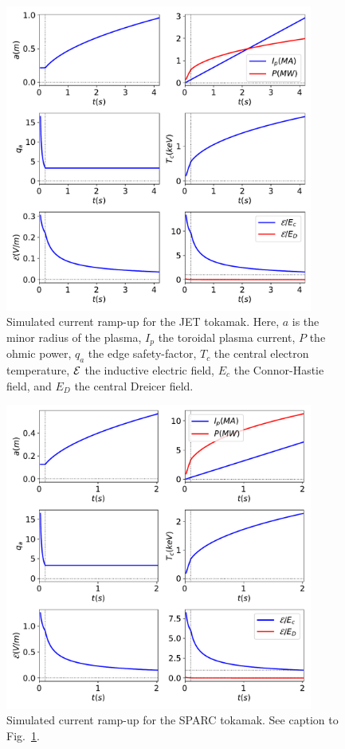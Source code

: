 \documentclass[12pt,prb,aps]{revtex4-1}
\begin{document}
\begin{figure}
\centerline{\includegraphics[width=0.9\textwidth]{Figure4.pdf}}
\caption{Simulated current ramp-up for the JET tokamak. Here, $a$ is the minor radius of the plasma, $I_p$ the toroidal plasma
current, $P$ the ohmic power, $q_a$ the edge safety-factor, $T_c$ the central electron temperature, ${\cal E}$ the
inductive electric field, $E_c$ the Connor-Hastie field, and $E_D$ the central Dreicer field. }\label{fig4}
\end{figure}

\begin{figure}
\centerline{\includegraphics[width=0.9\textwidth]{Figure5.pdf}}
\caption{Simulated current ramp-up for the SPARC tokamak. See caption to Fig.~\ref{fig4}.}\label{fig5}
\end{figure}
\end{document}
